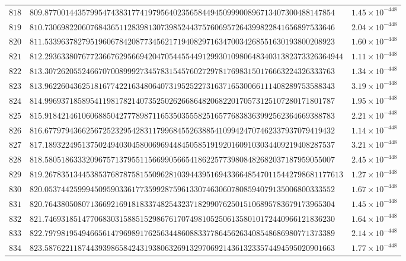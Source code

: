 \documentclass[12pt,reqno]{amsart}
\theoremstyle{remark}
\begin{document}
\begin{longtable}{clc}
$818$ & $809.8770014435799547438317741979564023565844945099900896713407300488147854$ & $1.45\times 10^{-448}$ \\
$819$ & $810.7306982206076843651128398130739852443757606957264399822841656897533646$ & $2.04\times 10^{-448}$ \\
$820$ & $811.5339637827951960678420877345621719408297163470034268551630193800208923$ & $1.60\times 10^{-448}$ \\
$821$ & $812.293633807677236676295669420470544554491299301098064834031382373326364944$ & $1.11\times 10^{-448}$ \\
$822$ & $813.3072620552466707008999273457831545760272978176983150176663224326333763$ & $1.34\times 10^{-448}$ \\
$823$ & $813.9622604362518167742216348064073195252273163716530066111408289753588343$ & $3.19\times 10^{-448}$ \\
$824$ & $814.9969371858954119817821407352502626686482068220170573125107280171801787$ & $1.95\times 10^{-448}$ \\
$825$ & $815.9184214610606885042777898711653503555825165776838363992562364669388783$ & $2.21\times 10^{-448}$ \\
$826$ & $816.6779794366256725232954283117996845526388541099424707462337937079419432$ & $1.14\times 10^{-448}$ \\
$827$ & $817.1893224951375024940304580069694484505851919201609103034409219408287537$ & $3.21\times 10^{-448}$ \\
$828$ & $818.5805186333209675713795511566990566541862257739808482682037187959055007$ & $2.45\times 10^{-448}$ \\
$829$ & $819.267835134453853768787581550962810394439516943366485470115442798681177613$ & $1.27\times 10^{-448}$ \\
$830$ & $820.0537442599945095903361773599287596133074630607808594079135006800333552$ & $1.67\times 10^{-448}$ \\
$831$ & $820.7643805080713669216918183374825432371829907625015106895783679173965304$ & $1.45\times 10^{-448}$ \\
$832$ & $821.7469318514770683031588515298676170749810525061358010172440966121836230$ & $1.64\times 10^{-448}$ \\
$833$ & $822.7979819549466561479698917625634486088337786456263408548686980771373389$ & $2.14\times 10^{-448}$ \\
$834$ & $823.5876221187443939865842431938063269132970692143613233574494595020901663$ & $1.77\times 10^{-448}$ \\

\end{longtable}
\end{document}
